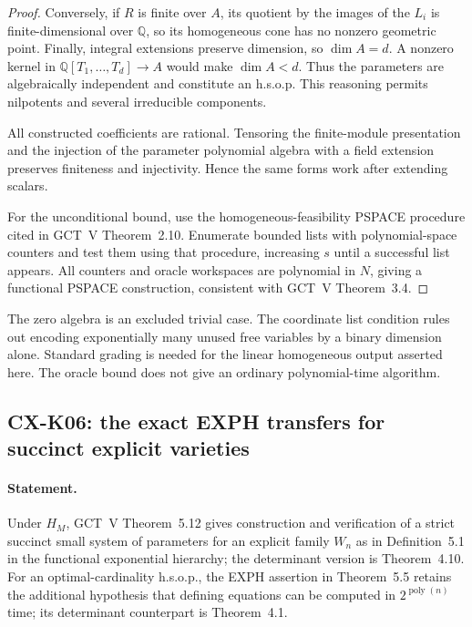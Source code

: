 \begin{proof}
Conversely, if $R$ is finite over $A$, its quotient by the images of
the $L_i$ is finite-dimensional over $\mathbb Q$, so its homogeneous
cone has no nonzero geometric point. Finally, integral extensions
preserve dimension, so $\dim A=d$. A nonzero kernel in
$\mathbb Q[T_1,\ldots,T_d]\to A$ would make $\dim A<d$.
Thus the parameters are algebraically independent and constitute an
h.s.o.p. This reasoning permits nilpotents and several irreducible
components.

All constructed coefficients are rational. Tensoring the finite-module
presentation and the injection of the parameter polynomial algebra
with a field extension preserves finiteness and injectivity. Hence
the same forms work after extending scalars.

For the unconditional bound, use the homogeneous-feasibility PSPACE
procedure cited in GCT~V Theorem~2.10. Enumerate bounded lists with
polynomial-space counters and test them using that procedure,
increasing $s$ until a successful list appears. All counters and
oracle workspaces are polynomial in $N$, giving a functional PSPACE
construction, consistent with GCT~V Theorem~3.4.
\end{proof}

The zero algebra is an excluded trivial case. The coordinate list
condition rules out encoding exponentially many unused free variables
by a binary dimension alone. Standard grading is needed for the
linear homogeneous output asserted here. The oracle bound does not
give an ordinary polynomial-time algorithm.

\subsection{CX-K06: the exact EXPH transfers for succinct explicit varieties}
\label{cx:k06}

\paragraph{Statement.}
Under $H_M$, GCT~V Theorem~5.12 gives construction and verification of
a strict succinct small system of parameters for an explicit family
$W_n$ as in Definition~5.1 in the functional exponential hierarchy;
the determinant version is Theorem~4.10. For an optimal-cardinality
h.s.o.p., the EXPH assertion in Theorem~5.5 retains the additional
hypothesis that defining equations can be computed in
$2^{\operatorname{poly}(n)}$ time; its determinant counterpart is
Theorem~4.1.

